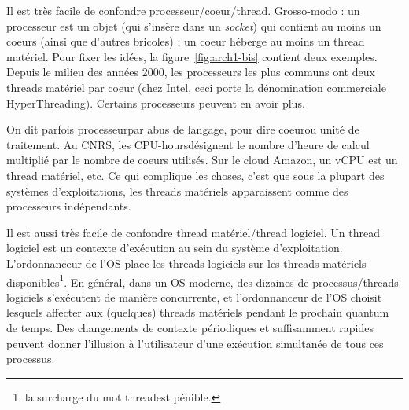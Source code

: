 \begin{danger}Il est très facile de confondre
  processeur/coeur/thread. Grosso-modo : un processeur est un objet (qui
  s'insère dans un \og \emph{socket}\fg) qui contient au moins un coeurs (ainsi
  que d'autres bricoles) ; un coeur héberge au moins un thread matériel. Pour
  fixer les idées, la figure~\ref{fig:arch1-bis} contient deux exemples. Depuis le
  milieu des années 2000, les processeurs les plus communs ont deux threads
  matériel par coeur (chez Intel, ceci porte la dénomination commerciale \og
  HyperThreading\fg). Certains processeurs peuvent en avoir plus.
\end{danger}

On dit parfois \og processeur\fg par abus de langage, pour dire \og coeur\fg ou
\og unité de traitement\fg. Au CNRS, les \og CPU-hours\fg désignent le nombre
d'heure de calcul multiplié par le nombre de coeurs utilisés. Sur le cloud
Amazon, un vCPU est un thread matériel, etc. Ce qui complique les choses, c'est
que sous la plupart des systèmes d'exploitations, les threads matériels
apparaissent comme des processeurs indépendants.


\begin{danger}
  Il est aussi très facile de confondre thread matériel/thread logiciel. Un
  thread logiciel est un contexte d'exécution au sein du système
  d'exploitation. L'ordonnanceur de l'OS place les threads logiciels sur les
  threads matériels disponibles\footnote{la surcharge du mot \og thread\fg est
    pénible.}. En général, dans un OS moderne, des dizaines de
  processus/threads logiciels s'exécutent de manière concurrente, et
  l'ordonnanceur de l'OS choisit lesquels affecter aux (quelques) threads
  matériels pendant le prochain quantum de temps. Des changements de contexte
  périodiques et suffisamment rapides peuvent donner l'illusion à l'utilisateur
  d'une exécution simultanée de tous ces processus.
\end{danger}


